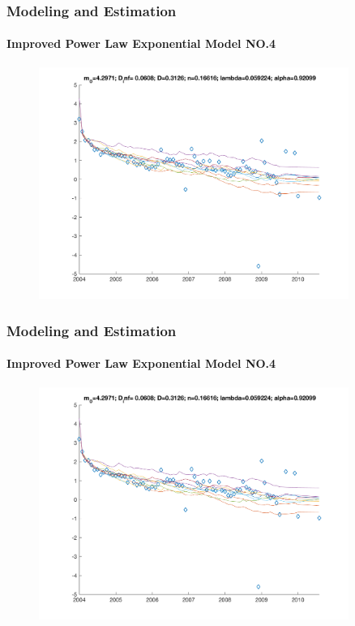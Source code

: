 \documentclass[11pt]{beamer}
\begin{document}
	
\begin{frame}
	\frametitle{Modeling and Estimation}
	\framesubtitle{Improved Power Law Exponential Model NO.4}
	\justifying
	\begin{figure}
		\begin{center}
			\includegraphics[width=0.9\textwidth  ]{AAplot_12} 
		\end{center}
	\end{figure}				
\end{frame}	


\begin{frame}
	\frametitle{Modeling and Estimation}
	\framesubtitle{Improved Power Law Exponential Model NO.4}
	\justifying
	\begin{figure}
		\begin{center}
			\includegraphics[width=0.9\textwidth  ]{AAplot_12} 
		\end{center}
	\end{figure}				
\end{frame}	
\end{document}
